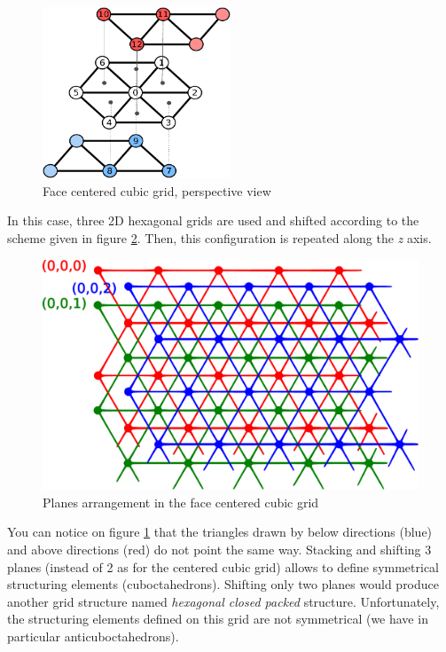 \documentclass[a4paper,10pt,oneside]{article}
\begin{document}
\begin{figure}
\centering
\includegraphics[width=0.5\textwidth]{figures/Fccubic_grid_3D.pdf}
\caption{Face centered cubic grid, perspective view}
\label{fig:fcc_grid_3D}
\end{figure}

In this case, three 2D hexagonal grids are used and shifted according to the scheme given in figure \ref{fig:FCC_grid_piling}.
Then, this configuration is repeated along the \emph{z} axis.

\begin{figure}
\centering
\includegraphics[scale=0.5]{figures/FCC_grid_piling.pdf}
\caption{Planes arrangement in the face centered cubic grid}
\label{fig:FCC_grid_piling}
\end{figure}

You can notice on figure \ref{fig:fcc_grid_3D}
that the triangles drawn by below directions (blue) and above directions (red)
do not point the same way. Stacking and shifting 3 planes (instead of 2 as for
the centered cubic grid) allows to define symmetrical structuring elements (cuboctahedrons).
Shifting only two planes would produce another grid structure named \textit{hexagonal
closed packed} structure. Unfortunately, the structuring elements defined on this grid
are not symmetrical (we have in particular anticuboctahedrons).
\end{document}
